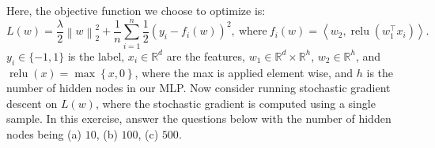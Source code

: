 \documentclass[letterpaper,11pt]{article}
\begin{document}
Here, the objective function we choose to optimize is:
\begin{equation}
  L(w) = \frac{\lambda}{2}\left\lVert w \right\rVert_2^2  + \frac{1}{n}\sum_{i=1}^n\frac{1}{2}\left(y_i - f_i(w)\right)^2,~\text{where}~
  f_i(w) = \left\langle w_2, \operatorname{relu}\left(w_1^\intercal x_i\right)\right\rangle.
\end{equation}
$y_i \in \{-1, 1\}$ is the label, $x_i \in \mathbb{R}^d$ are the features,
$w_1 \in \mathbb{R}^d \times \mathbb{R}^h$, $w_2 \in \mathbb{R}^h$, and
$\operatorname{relu}(x) = \max\left\{x, 0\right\}$, where the max is applied
element wise, and $h$ is the number of hidden nodes in our MLP.  Now consider
running stochastic gradient descent on $L(w)$, where the stochastic gradient is
computed using a single sample. In this exercise, answer the questions below
with the number of hidden nodes being (a) $10$, (b) $100$, (c) $500$.
\end{document}
